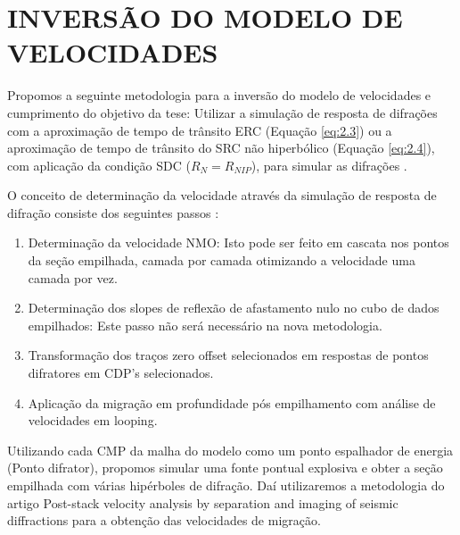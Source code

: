 \chapter{INVERSÃO DO MODELO DE VELOCIDADES}
\label{cap8:velocidades}

Propomos a seguinte metodologia para a inversão do modelo de velocidades e cumprimento do objetivo da tese:
Utilizar a simulação de resposta de difrações com a aproximação de tempo de trânsito ERC (Equação \ref{eq:2.3}) ou
a aproximação de tempo de trânsito do SRC não hiperbólico (Equação \ref{eq:2.4}), 
com aplicação da condição SDC ($R_N=R_{NIP}$),
para simular as difrações \cite{diffractions}.

O conceito de determinação da velocidade através da simulação de resposta de difração
consiste dos seguintes passos \cite{diffractions}:

\begin{enumerate}
 \item Determinação da velocidade NMO: Isto pode ser feito em cascata nos pontos da
seção empilhada, camada por camada otimizando a velocidade uma camada por vez.
\item Determinação dos slopes de reflexão de afastamento nulo no cubo de dados empilhados: 
Este passo não será necessário na nova metodologia.
\item Transformação dos traços zero offset selecionados em respostas de pontos difratores em CDP's
selecionados.
\item Aplicação da migração em profundidade pós empilhamento com análise de velocidades
em looping.
\end{enumerate}

Utilizando cada CMP da malha do modelo como um ponto espalhador de energia (Ponto difrator), propomos 
simular uma fonte pontual explosiva e obter a seção empilhada com várias hipérboles de difração. 
Daí utilizaremos a metodologia do artigo Post-stack velocity analysis by separation and imaging of seismic 
diffractions para a obtenção das velocidades de migração.